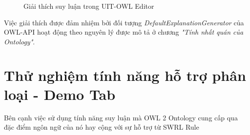 \begin{figure}[H]
	\centering
	\caption{Giải thích suy luận trong UIT-OWL Editor\label{overflow}}
\end{figure}
Việc giải thích được đảm nhiệm bởi đối tượng \textit{DefaultExplanationGenerator} của OWL-API hoạt động theo nguyên lý được mô tả ở chương \textit{"Tính nhất quán của Ontology"}.

\section{Thử nghiệm tính năng hỗ trợ phân loại - Demo Tab}
Bên cạnh việc sử dụng tính năng suy luận mà OWL 2 Ontology cung cấp qua đặc điểm ngôn ngữ của nó hay cộng với sự hỗ trợ từ SWRL Rule









